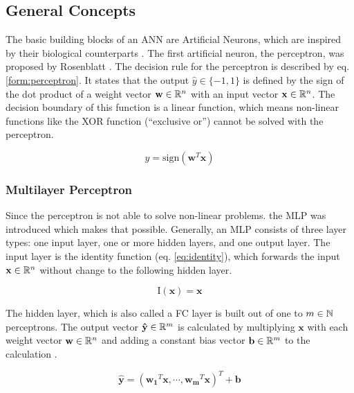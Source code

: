 \subsection{General Concepts}
\label{sec:deep_basics}

The basic building blocks of an \ac{ANN} are Artificial Neurons, which are inspired by  their biological counterparts \cite{bioneuron}.
The first artificial neuron, the perceptron, was proposed by Rosenblatt \cite{perceptron}.
The decision rule for the perceptron is described by eq. \ref{form:perceptron}.
It states that the output $\hat{y} \in \{-1, 1\}$ is defined by the sign of the dot product of a weight vector $\mathbf{w} \in \mathbb{R}^{n}$ with an input vector $\mathbf{x} \in \mathbb{R}^{n}$.
The decision boundary of this function is a linear function, which means non-linear functions like the XOR function (``exclusive or'') cannot be solved with the perceptron.

\begin{equation}
    \hat{y} = \text{sign}(\mathbf{w}^T \mathbf{x})
    \label{form:perceptron}
\end{equation}

\subsubsection{Multilayer Perceptron}

Since the perceptron is not able to solve non-linear problems. the \ac{MLP} was introduced \cite{mlp} which makes that possible.
Generally, an \ac{MLP} consists of three layer types: one input layer, one or more hidden layers, and one output layer.
The input layer is the identity function (eq. \ref{eq:identity}), which forwards the input $\textbf{x} \in \mathbb{R}^n$ without change to the following hidden layer.

\begin{equation}
    \text{I}(\mathbf{x}) = \mathbf{x}
    \label{eq:identity}
\end{equation}

The hidden layer, which is also called a \ac{FC} layer \cite{dl} is built out of one to $m \in \mathbb{N}$ perceptrons.
The output vector $\mathbf{\hat{y}} \in \mathbb{R}^m$ is calculated by multiplying $\mathbf{x}$ with each weight vector $\mathbf{w} \in \mathbb{R}^n$ and adding a constant bias vector $\mathbf{b} \in \mathbb{R}^m$ to the calculation \cite{dl_mit}.

\begin{equation}
    \mathbf{\hat{y}} = (\mathbf{w_1}^T\mathbf{x}, \cdots, \mathbf{w_m}^T\mathbf{x})^T + \mathbf{b}
\end{equation}

